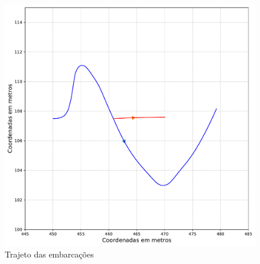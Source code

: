     
        \begin{figure}[H]
            \centering
            \includegraphics[scale=0.45]{fig/chap5/overtake_trajectory.pdf}
            \caption{Trajeto das embarcações}
            \label{fig:chap5_overtake_paths}
        \end{figure}
        
